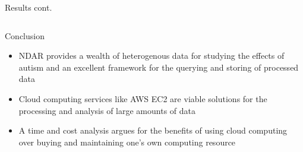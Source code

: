 \documentclass[final,hyperref={pdfpagelabels=false}]{beamer}
\begin{document}
\begin{frame}
\begin{columns}
\begin{column}{.5\textwidth}
{\begin{block}{Results cont.}
\begin{column}{.47\textwidth}
          \end{column}
        \end{block}
        \begin{block}{Conclusion}
            \begin{itemize}
                \item NDAR provides a wealth of heterogenous data for studying the effects of autism and an excellent framework for the querying and storing of processed data
                \item Cloud computing services like AWS EC2 are viable solutions for the processing and analysis of large amounts of data
                \item A time and cost analysis argues for the benefits of using cloud computing over buying and maintaining one's own computing resource
            \end{itemize}
        \end{block}
          }
    \end{column}
  \end{columns}
\end{frame}
\end{document}
